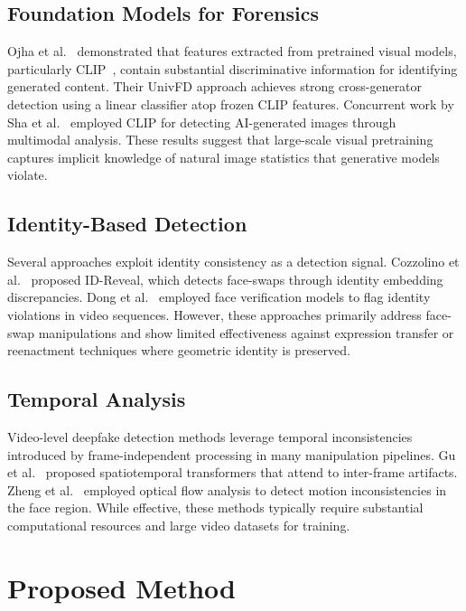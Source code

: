 \documentclass[11pt, twocolumn]{article}
\begin{document}
\subsection{Foundation Models for Forensics}

Ojha et al.~\cite{ojha2023universal} demonstrated that features extracted from pretrained visual models, particularly CLIP~\cite{radford2021clip}, contain substantial discriminative information for identifying generated content. Their UnivFD approach achieves strong cross-generator detection using a linear classifier atop frozen CLIP features. Concurrent work by Sha et al.~\cite{sha2023defake} employed CLIP for detecting AI-generated images through multimodal analysis. These results suggest that large-scale visual pretraining captures implicit knowledge of natural image statistics that generative models violate.

\subsection{Identity-Based Detection}

Several approaches exploit identity consistency as a detection signal. Cozzolino et al.~\cite{cozzolino2021id} proposed ID-Reveal, which detects face-swaps through identity embedding discrepancies. Dong et al.~\cite{dong2022protecting} employed face verification models to flag identity violations in video sequences. However, these approaches primarily address face-swap manipulations and show limited effectiveness against expression transfer or reenactment techniques where geometric identity is preserved.

\subsection{Temporal Analysis}

Video-level deepfake detection methods leverage temporal inconsistencies introduced by frame-independent processing in many manipulation pipelines. Gu et al.~\cite{gu2022exploiting} proposed spatiotemporal transformers that attend to inter-frame artifacts. Zheng et al.~\cite{zheng2021exploring} employed optical flow analysis to detect motion inconsistencies in the face region. While effective, these methods typically require substantial computational resources and large video datasets for training.

\section{Proposed Method}
\end{document}
